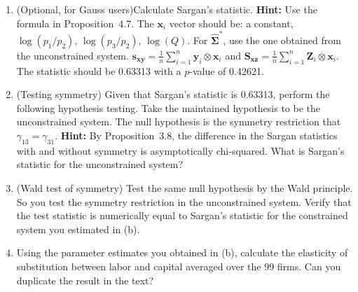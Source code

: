 \begin{problemset}
\begin{enumerate}[label=(\alph*)]
\item (Optional, for Gauss users)\quad Calculate Sargan's statistic.
\textbf{Hint:} Use the formula in Proposition~4.7.
The $\mathbf{x}_i$ vector should be: a constant, $\log(p_1/p_2)$,
$\log(p_3/p_2)$, $\log(Q)$.
For $\widehat{\boldsymbol{\Sigma}}^*$, use the one obtained from the unconstrained
system.
$\mathbf{s}_{\mathbf{xy}} = \frac{1}{n} \sum_{i=1}^{n} \mathbf{y}_i \otimes \mathbf{x}_i$
and $\mathbf{S}_{\mathbf{xz}} = \frac{1}{n} \sum_{i=1}^{n} \mathbf{Z}_i \otimes \mathbf{x}_i$.
The statistic should be 0.63313 with a $p$-value of 0.42621.

\item (Testing symmetry)\quad
Given that Sargan's statistic is 0.63313, perform the following hypothesis testing.
Take the maintained hypothesis to be the unconstrained system.
The null hypothesis is the symmetry restriction that $\gamma_{13} = \gamma_{31}$.
\textbf{Hint:} By Proposition~3.8, the difference in the Sargan statistics with and
without symmetry is asymptotically chi-squared. What is Sargan's statistic for
the unconstrained system?

\item (Wald test of symmetry)\quad
Test the same null hypothesis by the Wald principle.
So you test the symmetry restriction in the unconstrained system. Verify that
the test statistic is numerically equal to Sargan's statistic for the constrained
system you estimated in (b).

\item Using the parameter estimates you obtained in (b), calculate the elasticity of
substitution between labor and capital averaged over the 99 firms. Can you
duplicate the result in the text?
\end{enumerate}

\end{problemset}

